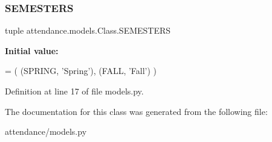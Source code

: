 \subsubsection{\texorpdfstring{S\+E\+M\+E\+S\+T\+E\+RS}{SEMESTERS}}
{\footnotesize\ttfamily tuple attendance.\+models.\+Class.\+S\+E\+M\+E\+S\+T\+E\+RS\hspace{0.3cm}{\ttfamily [static]}}

{\bfseries Initial value\+:}
\begin{DoxyCode}
=  (
        (SPRING, \textcolor{stringliteral}{'Spring'}),
        (FALL, \textcolor{stringliteral}{'Fall'})
    )
\end{DoxyCode}


Definition at line 17 of file models.\+py.



The documentation for this class was generated from the following file\+:\begin{DoxyCompactItemize}
\item 
attendance/models.\+py\end{DoxyCompactItemize}
